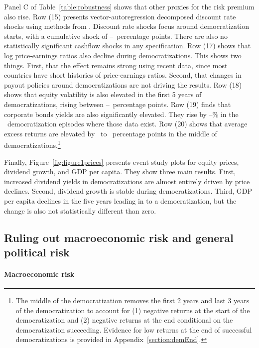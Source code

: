 \documentclass[12pt]{article}
\numberwithin{equation}{section}
\begin{document}
Panel C of Table~\ref{table:robustness} shows that other proxies for the risk premium also rise. Row (15) presents vector-autoregression decomposed discount rate shocks using methods from \cite{Campbell1991}. Discount rate shocks focus around democratization starts, with a cumulative shock of \tabBThreeDRLow\---\tabBThreeDRHigh\ percentage points. There are also no statistically significant cashflow shocks in any specification. Row (17) shows that log price-earnings ratios also decline during democratizations. This shows two things. First, that the effect remains strong using recent data, since most countries have short histories of price-earnings ratios. Second, that changes in payout policies around democratizations are not driving the results. Row (18) shows that equity volatility is also elevated in the first 5 years of democratizations, rising between \tabBThreeEVolLow\---\tabBThreeEVolHigh\ percentage points. Row (19) finds that corporate bonds yields are also significantly elevated. They rise by \tabBThreeCorpBondLow\---\tabBThreeCorpBondHigh\% in the \tabBThreeCorpBondDem\ democratization episodes where those data exist. Row (20) shows that average excess returns are elevated by \tabBThreeExcRetLow\ to \tabBThreeExcRetHigh\ percentage points in the middle of democratizations.\footnote{The middle of the democratization removes the first 2 years and last 3 years of the democratization to account for (1) negative returns at the start of the democratization and (2) negative returns at the end conditional on the democratization succeeding. Evidence for low returns at the end of successful democratizations is provided in Appendix~\ref{section:demEnd}.}

Finally, Figure~\ref{fig:figure1prices} presents event study plots for equity prices, dividend growth, and GDP per capita. They show three main results. First, increased dividend yields in democratizations are almost entirely driven by price declines. Second, dividend growth is stable during democratizations. Third, GDP per capita declines in the five years leading in to a democratization, but the change is also not statistically different than zero.

\subsection{Ruling out macroeconomic risk and general political risk}\label{section:macropol}

\paragraph{Macroeconomic risk}
\end{document}
